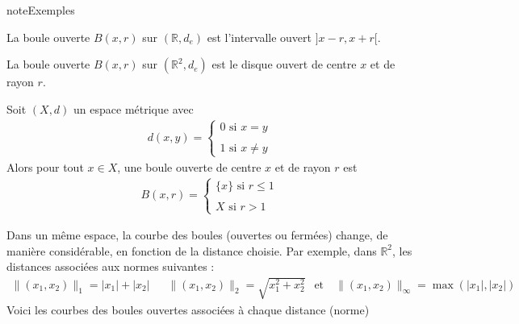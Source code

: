 \documentclass[letterpaper,10pt,french]{sphinxmanual}
\let\sphinxpxdimen\pdfpxdimen\else\newdimen\sphinxpxdimen
\begin{document}
\begin{sphinxadmonition}{note}{Exemples}

\sphinxhyphen{} La boule ouverte \(B(x, r)\) sur \((\mathbb R, d_e)\) est l’intervalle ouvert \(]x-r, x+r[\).

\sphinxhyphen{} La boule ouverte \(B(x, r)\) sur \((\mathbb R^2, d_e)\) est le disque  ouvert de centre \(x\) et de rayon \(r\).

\sphinxhyphen{} Soit \((X, d)\) un espace métrique avec
\begin{equation*}
\begin{split}
d(x,y) = \begin{cases}
0 \mbox{ si } x = y \\\\
1 \mbox{ si } x \neq y
\end{cases}
\end{split}
\end{equation*}
\sphinxAtStartPar
Alors pour tout \(x\in X\), une boule ouverte de centre \(x\) et de rayon \(r\) est
\begin{equation*}
\begin{split}
B(x, r) = \begin{cases}
\{x\}\mbox{ si } r \leq 1 \\\\
X \mbox{ si } r>1
\end{cases}
\end{split}
\end{equation*}\end{sphinxadmonition}

\sphinxAtStartPar
Dans un même espace, la courbe des boules (ouvertes ou fermées) change, de manière considérable, en fonction de la distance choisie. Par exemple, dans \(\mathbb R^2\), les distances associées aux normes suivantes :
\begin{equation*}
\begin{split}
\|(x_1, x_2)\|_1=|x_1|+|x_2| ~~~~~~~ \|(x_1, x_2)\|_2=\sqrt{x_1^2+ x_2^2} ~~ \mbox{ et }~~~ \|(x_1, x_2)\|_\infty=\max(|x_1|,|x_2|)\end{split}
\end{equation*}
\sphinxAtStartPar
Voici les courbes des boules ouvertes associées à chaque distance (norme)

\noindent{\hspace*{\fill}\sphinxincludegraphics[width=450\sphinxpxdimen]{{fig1}.PNG}\hspace*{\fill}}
\end{document}
